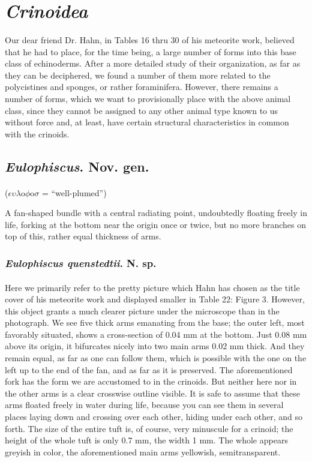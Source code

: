 \documentclass[a4paper, 12pt, oneside]{article}
\begin{document}
\section{\emph{Crinoidea}}
\paragraph{}
Our dear friend Dr. Hahn, in Tables 16 thru 30 of his meteorite work, believed that he had to place, for the time being, a large number of forms into this base class of echinoderms. After a more detailed study of their organization, as far as they can be deciphered, we found a number of them more related to the polycistines and sponges, or rather foraminifera. However, there remains a number of forms, which we want to provisionally place with the above animal class, since they cannot be assigned to any other animal type known to us without force and, at least, have certain structural characteristics in common with the crinoids.
\subsection{\emph{Eulophiscus}. Nov. gen.}
\paragraph{}
($\epsilon\upsilon\lambda$o$\phi$o$\sigma$ = ``well-plumed'')%

A fan-shaped bundle with a central radiating point, undoubtedly floating freely in life, forking at the bottom near the origin once or twice, but no more branches on top of this, rather equal thickness of arms.
\subsubsection{\emph{Eulophiscus quenstedtii}. N. sp.}
\paragraph{}
Here we primarily refer to the pretty picture which Hahn has chosen as the title cover of his meteorite work and displayed smaller in Table 22: Figure 3. However, this object grants a much clearer picture under the microscope than in the photograph. We see five thick arms emanating from the base; the outer left, most favorably situated, shows a cross-section of 0.04 mm at the bottom. Just 0.08 mm above its origin, it bifurcates nicely into two main arms 0.02 mm thick. And they remain equal, as far as one can follow them, which is possible with the one on the left up to the end of the fan, and as far as it is preserved. The aforementioned fork has the form we are accustomed to in the crinoids. But neither here nor in the other arms is a clear crosswise outline visible. It is safe to assume that these arms floated freely in water during life, because you can see them in several places laying down and crossing over each other, hiding under each other, and so forth. The size of the entire tuft is, of course, very minuscule for a crinoid; the height of the whole tuft is only 0.7 mm, the width 1 mm. The whole appears greyish in color, the aforementioned main arms yellowish, semitransparent.
\end{document}
